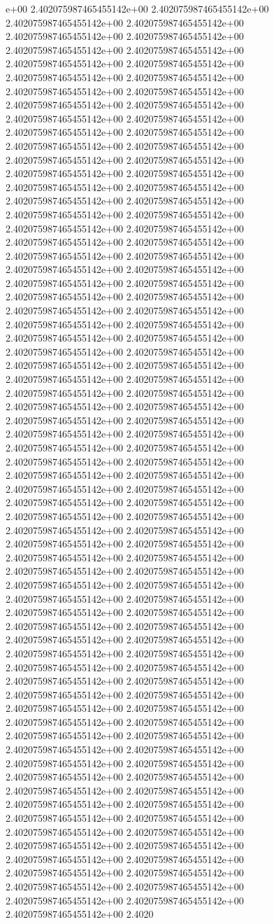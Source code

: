 e+00	2.402075987465455142e+00	2.402075987465455142e+00	2.402075987465455142e+00	2.402075987465455142e+00	2.402075987465455142e+00	2.402075987465455142e+00	2.402075987465455142e+00	2.402075987465455142e+00	2.402075987465455142e+00	2.402075987465455142e+00	2.402075987465455142e+00	2.402075987465455142e+00	2.402075987465455142e+00	2.402075987465455142e+00	2.402075987465455142e+00	2.402075987465455142e+00	2.402075987465455142e+00	2.402075987465455142e+00	2.402075987465455142e+00	2.402075987465455142e+00	2.402075987465455142e+00	2.402075987465455142e+00	2.402075987465455142e+00	2.402075987465455142e+00	2.402075987465455142e+00	2.402075987465455142e+00	2.402075987465455142e+00	2.402075987465455142e+00	2.402075987465455142e+00	2.402075987465455142e+00	2.402075987465455142e+00	2.402075987465455142e+00	2.402075987465455142e+00	2.402075987465455142e+00	2.402075987465455142e+00	2.402075987465455142e+00	2.402075987465455142e+00	2.402075987465455142e+00	2.402075987465455142e+00	2.402075987465455142e+00	2.402075987465455142e+00	2.402075987465455142e+00	2.402075987465455142e+00	2.402075987465455142e+00	2.402075987465455142e+00	2.402075987465455142e+00	2.402075987465455142e+00	2.402075987465455142e+00	2.402075987465455142e+00	2.402075987465455142e+00	2.402075987465455142e+00	2.402075987465455142e+00	2.402075987465455142e+00	2.402075987465455142e+00	2.402075987465455142e+00	2.402075987465455142e+00	2.402075987465455142e+00	2.402075987465455142e+00	2.402075987465455142e+00	2.402075987465455142e+00	2.402075987465455142e+00	2.402075987465455142e+00	2.402075987465455142e+00	2.402075987465455142e+00	2.402075987465455142e+00	2.402075987465455142e+00	2.402075987465455142e+00	2.402075987465455142e+00	2.402075987465455142e+00	2.402075987465455142e+00	2.402075987465455142e+00	2.402075987465455142e+00	2.402075987465455142e+00	2.402075987465455142e+00	2.402075987465455142e+00	2.402075987465455142e+00	2.402075987465455142e+00	2.402075987465455142e+00	2.402075987465455142e+00	2.402075987465455142e+00	2.402075987465455142e+00	2.402075987465455142e+00	2.402075987465455142e+00	2.402075987465455142e+00	2.402075987465455142e+00	2.402075987465455142e+00	2.402075987465455142e+00	2.402075987465455142e+00	2.402075987465455142e+00	2.402075987465455142e+00	2.402075987465455142e+00	2.402075987465455142e+00	2.402075987465455142e+00	2.402075987465455142e+00	2.402075987465455142e+00	2.402075987465455142e+00	2.402075987465455142e+00	2.402075987465455142e+00	2.402075987465455142e+00	2.402075987465455142e+00	2.402075987465455142e+00	2.402075987465455142e+00	2.402075987465455142e+00	2.402075987465455142e+00	2.402075987465455142e+00	2.402075987465455142e+00	2.402075987465455142e+00	2.402075987465455142e+00	2.402075987465455142e+00	2.402075987465455142e+00	2.402075987465455142e+00	2.402075987465455142e+00	2.402075987465455142e+00	2.402075987465455142e+00	2.402075987465455142e+00	2.402075987465455142e+00	2.402075987465455142e+00	2.402075987465455142e+00	2.402075987465455142e+00	2.402075987465455142e+00	2.402075987465455142e+00	2.402075987465455142e+00	2.402075987465455142e+00	2.402075987465455142e+00	2.402075987465455142e+00	2.402075987465455142e+00	2.402075987465455142e+00	2.402075987465455142e+00	2.402075987465455142e+00	2.402075987465455142e+00	2.402075987465455142e+00	2.402075987465455142e+00	2.402075987465455142e+00	2.4020